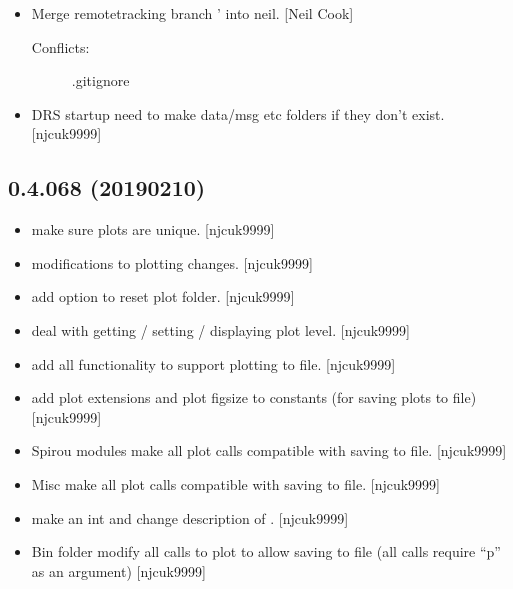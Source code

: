 \documentclass[a4paper,10pt,english]{report}
\begin{document}
\begin{itemize}
\begin{description}
\end{description}

\item {} 
Merge remote\sphinxhyphen{}tracking branch ’ into neil. {[}Neil
Cook{]}
\begin{description}
\item[{Conflicts:}] \leavevmode
.gitignore

\end{description}

\item {} 
DRS startup \sphinxhyphen{} need to make data/msg etc folders if they don’t exist.
{[}njcuk9999{]}

\end{itemize}


\subsection{0.4.068 (2019\sphinxhyphen{}02\sphinxhyphen{}10)}
\label{\detokenize{misc/changelog:id208}}\begin{itemize}
\item {} 
 \sphinxhyphen{} make sure plots are unique. {[}njcuk9999{]}

\item {} 
 \sphinxhyphen{} modifications to plotting changes.
{[}njcuk9999{]}

\item {} 
 \sphinxhyphen{} add option to reset plot folder. {[}njcuk9999{]}

\item {} 
 \sphinxhyphen{} deal with getting / setting / displaying plot
level. {[}njcuk9999{]}

\item {} 
 \sphinxhyphen{} add all functionality to support plotting to file.
{[}njcuk9999{]}

\item {} 
 \sphinxhyphen{} add plot extensions and plot figsize to constants
(for saving plots to file) {[}njcuk9999{]}

\item {} 
Spirou modules \sphinxhyphen{} make all plot calls compatible with saving to file.
{[}njcuk9999{]}

\item {} 
Misc \sphinxhyphen{} make all plot calls compatible with saving to file. {[}njcuk9999{]}

\item {} 
 \sphinxhyphen{} make  an int and change description of
. {[}njcuk9999{]}

\item {} 
Bin folder \sphinxhyphen{} modify all calls to plot to allow saving to file (all
calls require “p” as an argument) {[}njcuk9999{]}

\end{itemize}
\end{document}
